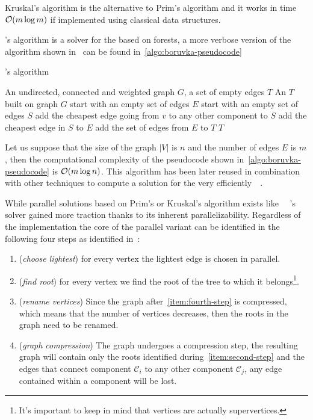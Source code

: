 \documentclass[a4paper,10pt]{article}
\begin{document}
Kruskal's algorithm is the alternative to Prim's algorithm and it works in time $\mathcal{O}(m\log{m})$ if implemented using classical data structures.

\brka's algorithm is a solver for the \mstp based on forests, a more verbose version of the algorithm shown in~\cite{boruvka-pseudocode} can be found in~\ref{algo:boruvka-pseudocode}
\begin{algorithm}
	\caption{\brka's algorithm}
	\label{algo:boruvka-pseudocode}
	\begin{algorithmic}[1]
		\REQUIRE An undirected, connected and weighted graph $G$, a set of empty edges $T$
		\ENSURE An \mst$T$ built on graph $G$
		\STATE start with an empty set of edges $E$
		\STATE start with an empty set of edges $S$
		\STATE add the cheapest edge going from $v$ to any other component to $S$
		\ENDFOR
		\STATE add the cheapest edge in $S$ to $E$
		\ENDFOR
		\STATE add the set of edges from $E$ to $T$
		\ENDWHILE
		\STATE\RETURN $T$
	\end{algorithmic}
\end{algorithm}

Let us suppose that the size of the graph $|V|$ is $n$ and the number of edges $E$ is $m$, then the computational complexity of the pseudocode shown in~\ref{algo:boruvka-pseudocode} is $\mathcal{O}(m\log{n})$. This algorithm has been later reused in combination with other techniques to compute a solution for the \mstp very efficiently~\cite{boruvka-ackermann}~\cite{karger-klein-tarjan}.

While parallel solutions based on Prim's or Kruskal's algorithm exists like~\cite{prim-parallel}~\cite{filter-kruskal} \brka's solver gained more traction thanks to its inherent parallelizability. Regardless of the implementation the core of the parallel variant can be identified in the following four steps as identified in~\cite{boruvka-steps}:
\begin{enumerate}
	\item\label{item:first-step} (\textit{choose lightest}) for every vertex the lightest edge is chosen in parallel.
	\item\label{item:second-step} (\textit{find root}) for every vertex we find the root of the tree to which it belongs\footnote{It's important to keep in mind that vertices are actually supervertices.}.
	\item\label{item:third-step} (\textit{rename vertices}) Since the graph after~\ref{item:fourth-step} is compressed, which means that the number of vertices decreases, then the roots in the graph need to be renamed.
	\item\label{item:fourth-step} (\textit{graph compression}) The graph undergoes a compression step, the resulting graph will contain only the roots identified during~\ref{item:second-step} and the edges that connect component $\mathcal{C}_i$ to any other component $\mathcal{C}_j$, any edge contained within a component will be lost.
\end{enumerate}
\end{document}
